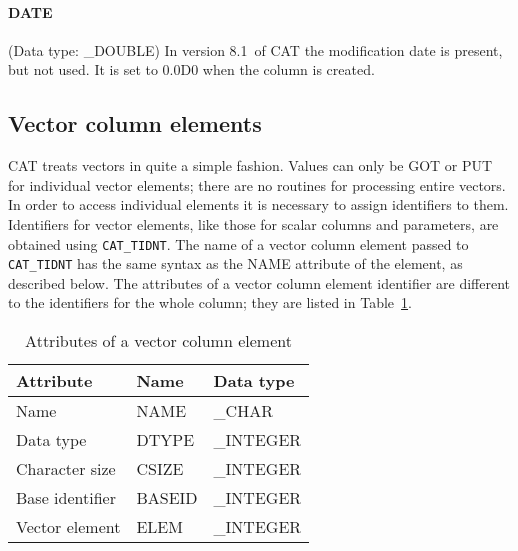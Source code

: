 \documentclass[11pt,twoside]{starlink}
\providecommand{\CATversion}{8.1~}
\begin{document}
\paragraph{DATE}
(Data type: \_DOUBLE)
In version \CATversion of CAT the modification date is present, but
not used. It is set to 0.0D0 when the column is created.


\subsection{\label{COLUMN_ELM}Vector column elements}

CAT treats vectors in quite a simple fashion. Values can only be GOT
or PUT for individual vector elements; there are no routines for
processing entire vectors. In order to access individual elements it
is necessary to assign identifiers to them. Identifiers for vector
elements, like those for scalar columns and parameters, are obtained
using \texttt{CAT\_TIDNT}. The name of a vector column element passed to
\texttt{CAT\_TIDNT} has the same syntax as the NAME attribute of the
element, as described below. The attributes of a vector column element
identifier are different to the identifiers for the whole column; they
are listed in Table~\ref{VCOL_ELEM}.

\begin{table}[htbp]

\begin{center}
\begin{tabular}{lll}
Attribute       & Name    & Data type  \\ \hline
Name            & NAME    & \_CHAR     \\
Data type       & DTYPE   & \_INTEGER  \\
Character size  & CSIZE   & \_INTEGER  \\
Base identifier & BASEID  & \_INTEGER  \\
Vector element  & ELEM    & \_INTEGER  \\
\end{tabular}
\end{center}

\caption{\label{VCOL_ELEM}Attributes of a vector column element}

\end{table}
\end{document}
